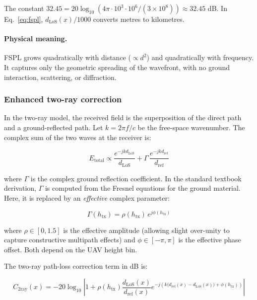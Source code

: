 The constant $32.45 = 20\log_{10}(4\pi \cdot 10^3 \cdot 10^6 / (3\times
10^8)) \approx 32.45$ dB. In Eq.~\eqref{eq:fspl}, $d_{\mathrm{LoS}}(x)/1000$
converts metres to kilometres.

\paragraph{Physical meaning.} FSPL grows quadratically with distance ($\propto
d^2$) and quadratically with frequency. It captures only the geometric
spreading of the wavefront, with no ground interaction, scattering, or
diffraction.

\subsubsection{Enhanced two-ray correction}

In the two-ray model, the received field is the superposition of the direct
path and a ground-reflected path. Let $k = 2\pi f / c$ be the free-space
wavenumber. The complex sum of the two waves at the receiver is:

\begin{equation}
E_{\mathrm{total}}
\propto
\frac{e^{-jkd_{\mathrm{LoS}}}}{d_{\mathrm{LoS}}}
+
\Gamma\,\frac{e^{-jkd_{\mathrm{ref}}}}{d_{\mathrm{ref}}}
\label{eq:field_sum}
\end{equation}

where $\Gamma$ is the complex ground reflection coefficient. In the standard
textbook derivation, $\Gamma$ is computed from the Fresnel equations for the
ground material. Here, it is replaced by an \emph{effective} complex
parameter:

\begin{equation}
\Gamma(h_{\mathrm{tx}})
=
\rho(h_{\mathrm{tx}})\,e^{j\phi(h_{\mathrm{tx}})}
\end{equation}

where $\rho \in [0, 1.5]$ is the effective amplitude (allowing slight
over-unity to capture constructive multipath effects) and $\phi \in [-\pi,
\pi]$ is the effective phase offset. Both depend on the UAV height bin.

The two-ray path-loss correction term in dB is:

\begin{equation}
C_{\mathrm{2ray}}(x)
=
-20 \log_{10}
\left|
1 + \rho(h_{\mathrm{tx}})
\frac{d_{\mathrm{LoS}}(x)}{d_{\mathrm{ref}}(x)}
e^{-j\left(k\bigl(d_{\mathrm{ref}}(x)-d_{\mathrm{LoS}}(x)\bigr)+\phi(h_{\mathrm{tx}})\right)}
\right|
\label{eq:c2ray}
\end{equation}

